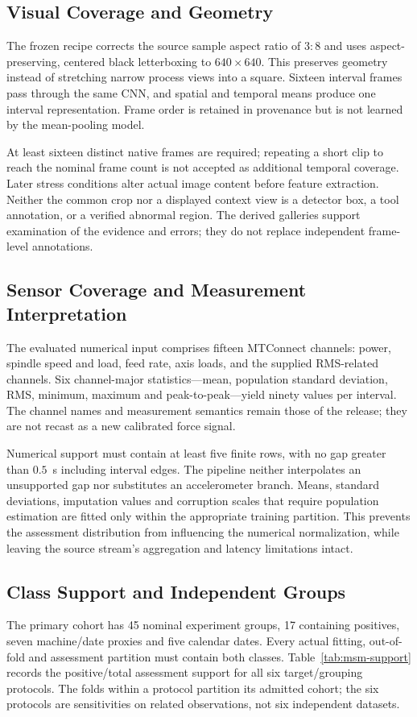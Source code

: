 \subsection{Visual Coverage and Geometry}
The frozen recipe corrects the source sample aspect ratio of $3{:}8$ and uses aspect-preserving, centered black letterboxing to $640\times640$. This preserves geometry instead of stretching narrow process views into a square. Sixteen interval frames pass through the same CNN, and spatial and temporal means produce one interval representation. Frame order is retained in provenance but is not learned by the mean-pooling model.

At least sixteen distinct native frames are required; repeating a short clip to reach the nominal frame count is not accepted as additional temporal coverage. Later stress conditions alter actual image content before feature extraction. Neither the common crop nor a displayed context view is a detector box, a tool annotation, or a verified abnormal region. The derived galleries support examination of the evidence and errors; they do not replace independent frame-level annotations.

\subsection{Sensor Coverage and Measurement Interpretation}
The evaluated numerical input comprises fifteen MTConnect channels: power, spindle speed and load, feed rate, axis loads, and the supplied RMS-related channels. Six channel-major statistics---mean, population standard deviation, RMS, minimum, maximum and peak-to-peak---yield ninety values per interval. The channel names and measurement semantics remain those of the release; they are not recast as a new calibrated force signal.

Numerical support must contain at least five finite rows, with no gap greater than $0.5$~s including interval edges. The pipeline neither interpolates an unsupported gap nor substitutes an accelerometer branch. Means, standard deviations, imputation values and corruption scales that require population estimation are fitted only within the appropriate training partition. This prevents the assessment distribution from influencing the numerical normalization, while leaving the source stream's aggregation and latency limitations intact.

\subsection{Class Support and Independent Groups}
The primary cohort has 45 nominal experiment groups, 17 containing positives, seven machine/date proxies and five calendar dates. Every actual fitting, out-of-fold and assessment partition must contain both classes. Table~\ref{tab:msm-support} records the positive/total assessment support for all six target/grouping protocols. The folds within a protocol partition its admitted cohort; the six protocols are sensitivities on related observations, not six independent datasets.

